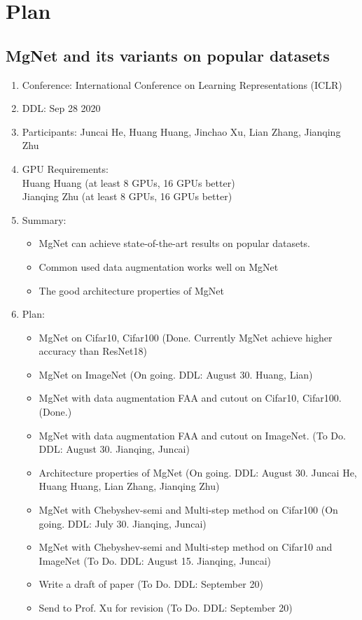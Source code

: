 \section{Plan}
\subsection{MgNet and its variants on popular datasets}

\begin{enumerate}
\item Conference: International Conference on Learning Representations (ICLR)
\item DDL: Sep 28 2020
\item Participants: Juncai He, Huang Huang, Jinchao Xu, Lian Zhang, Jianqing Zhu
\item GPU Requirements: \\
Huang Huang (at least 8 GPUs, 16 GPUs better)\\
Jianqing Zhu (at least 8 GPUs, 16 GPUs better)\\

\item Summary: 
\begin{itemize}
\item MgNet can achieve state-of-the-art results on popular datasets.
\item Common used data augmentation works well on MgNet
\item The good architecture properties of MgNet
\end{itemize}
\item Plan:
\begin{itemize}
\item MgNet on Cifar10, Cifar100 (Done. Currently MgNet achieve higher accuracy than ResNet18)
\item MgNet on ImageNet (On going. DDL: August 30. Huang, Lian)
\item MgNet with data augmentation FAA and cutout on Cifar10, Cifar100. (Done.)
\item MgNet with data augmentation FAA and cutout on ImageNet.  (To Do. DDL: August 30. Jianqing, Juncai)
\item Architecture properties of MgNet (On going. DDL: August 30. Juncai He, Huang Huang, Lian Zhang, Jianqing Zhu)
\item MgNet with Chebyshev-semi and Multi-step method on Cifar100 (On going. DDL: July 30. Jianqing, Juncai)
\item MgNet with Chebyshev-semi and Multi-step method on Cifar10 and ImageNet (To Do. DDL: August 15. Jianqing, Juncai)
\item Write a draft of paper (To Do. DDL: September 20)
\item Send to Prof. Xu for revision (To Do. DDL: September 20)
\end{itemize}
\end{enumerate}



